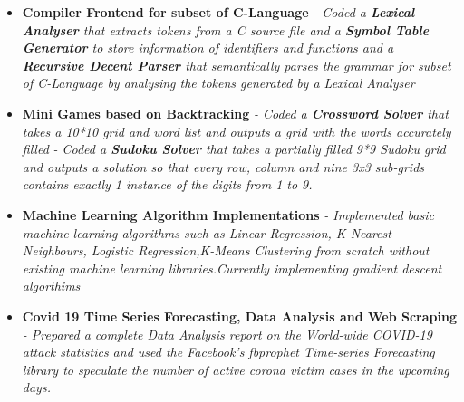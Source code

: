 \documentclass{article}
\begin{document}
\begin{itemize}
    \item{\textbf{\large{Compiler Frontend for subset of C-Language}}}
          \newline
          \textit{- Coded a \textbf{Lexical Analyser} that extracts tokens from a C source file and a \textbf{Symbol Table Generator} to store information of identifiers and functions and a \textbf{Recursive Decent Parser} that semantically parses the grammar for subset of C-Language by analysing the tokens generated by a Lexical Analyser}

    \item{\textbf{\large{Mini Games based on Backtracking}}}
          \newline
          \textit{- Coded a \textbf{Crossword Solver} that takes a 10*10 grid and word list and outputs a grid with the words accurately filled}
          \newline
          \textit{- Coded a \textbf{Sudoku Solver} that takes a partially filled 9*9 Sudoku grid and outputs a solution so that every row, column and nine 3x3 sub-grids contains exactly 1 instance of the digits from 1 to 9.}

    \item{\textbf{\large{Machine Learning Algorithm Implementations}}}
          \newline
          \textit{- Implemented basic machine learning algorithms such as Linear Regression, K-Nearest Neighbours, Logistic Regression,K-Means Clustering from scratch without existing machine learning libraries.Currently implementing gradient descent algorthims}


    \item{\textbf{\large{Covid 19 Time Series Forecasting, Data Analysis and Web Scraping}}}
          \newline
          \textit{- Prepared a complete Data Analysis report on the World-wide COVID-19 attack statistics and used the Facebook's fbprophet Time-series Forecasting library to speculate the number of active corona victim cases in the upcoming days.}


\end{itemize}
\end{document}
